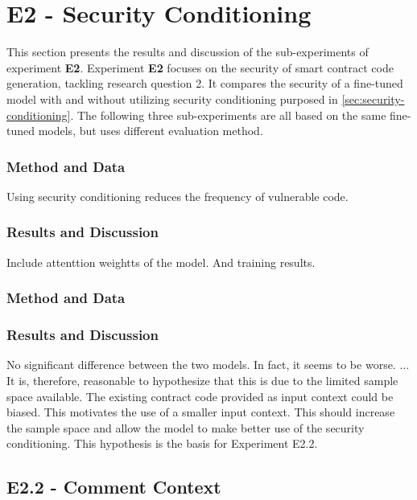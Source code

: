 \section{E2 - Security Conditioning}
\label{sec:e2-security-conditioning}
This section presents the results and discussion of the sub-experiments of experiment \textbf{E2}. Experiment \textbf{E2} focuses on the security of smart contract code generation, tackling research question 2. It compares the security of a fine-tuned model with and without utilizing security conditioning purposed in \cref{sec:security-conditioning}. The following three sub-experiments are all based on the same fine-tuned models, but uses different evaluation method.

\subsubsection{Method and Data}
Using security conditioning reduces the frequency of vulnerable code.

\subsubsection{Results and Discussion}
Include attenttion weightts of the model. And training results.

\label{sec:e2.1-complete-class-context}

\subsubsection{Method and Data}
\subsubsection{Results and Discussion}

No significant difference between the two models. In fact, it seems to be worse. ... It is, therefore, reasonable to hypothesize that this is due to the limited sample space available. The existing contract code provided as input context could be biased. This motivates the use of a smaller input context. This should increase the sample space and allow the model to make better use of the security conditioning. This hypothesis is the basis for Experiment E2.2.

\subsection{E2.2 - Comment Context}
\label{sec:e2.2-comment-context}

